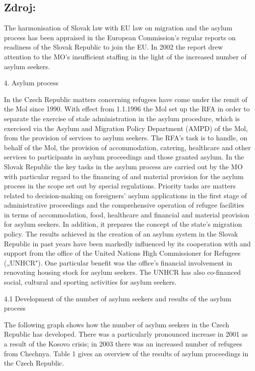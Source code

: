 \documentclass[10pt]{article}
\begin{document}
\subsection*{Zdroj:}

The harmonisation of Slovak law with EU law on migration and the asylum process has been appraised in the European Commission's regular reports on readiness of the Slovak Republic to join the EU.
In 2002 the report drew attention to the MO's insufficient staffing in the light of the increased number of asylum seekers.


4. Asylum process

In the Czech Republic matters concerning refugees have come under the remit of the Mol since 1990.
With effect from 1.1.1996 the Mol set up the RFA in order to separate the exercise of stale administration in the asylum procedure, which is exercised via the Asylum and Migration Policy Department (AMPD) of the Mol, from the provision of services to asylum seekers.
The RFA's task is to handle, on behalf of the Mol, the provision of accommodation, catering, healthcare and other services to participants in asylum proceedings and those granted asylum.
In the Slovak Republic the key tasks in the asylum process are carried out by the MO with particular regard to the financing of and material provision for the asylum process in the scope set out by special regulations.
Priority tasks are matters related to decision-making on foreigners' asylum applications in the first stage of administrative proceedings and the comprehensive operation of refugee facilities in terms of accommodation, food, healthcare and financial and material provision for asylum seekers.
In addition, it prepares the concept of the state's migration policy.
The results achieved in the creation of an asylum system in the Slovak Republic in past years have been markedly influenced by its cooperation with and support from the office of the United Nations High Commissioner for Refugees („UNHCR").
One particular benefit was the office's financial involvement in renovating housing stock for asylum seekers.
The UNHCR has also co-financed social, cultural and sporting activities for asylum seekers.


4.1 Development of the number of asylum seekers and results of the asylum process

The following graph shows how the number of asylum seekers in the Czech Republic has developed.
There was a particularly pronounced increase in 2001 as a result of the Kosovo crisis; in 2003 there was an increased number of refugees from Chechnya.
Table 1 gives an overview of the results of asylum proceedings in the Czech Republic.
\end{document}
